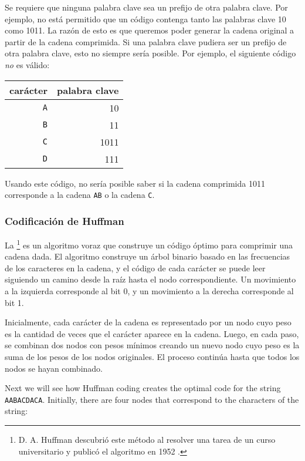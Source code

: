 Se requiere que ninguna palabra clave
sea un prefijo de otra palabra clave.
Por ejemplo, no está permitido que un código
contenga tanto las palabras clave 10
como 1011.
La razón de esto es que queremos
poder generar la cadena original
a partir de la cadena comprimida.
Si una palabra clave pudiera ser un prefijo de otra palabra clave,
esto no siempre sería posible.
Por ejemplo, el siguiente código \emph{no} es válido:
\begin{center}
\begin{tabular}{rr}
carácter & palabra clave \\
\hline
\texttt{A} & 10 \\
\texttt{B} & 11 \\
\texttt{C} & 1011 \\
\texttt{D} & 111 \\
\end{tabular}
\end{center}
Usando este código, no sería posible saber
si la cadena comprimida 1011 corresponde a
la cadena \texttt{AB} o la cadena \texttt{C}.


\subsubsection{Codificación de Huffman}

La \footnote{D. A. Huffman descubrió este método
al resolver una tarea de un curso universitario
y publicó el algoritmo en 1952 \cite{huf52}.} es un algoritmo voraz
que construye un código óptimo para
comprimir una cadena dada.
El algoritmo construye un árbol binario
basado en las frecuencias de los caracteres
en la cadena,
y el código de cada carácter se puede leer
siguiendo un camino desde la raíz hasta
el nodo correspondiente.
Un movimiento a la izquierda corresponde al bit 0,
y un movimiento a la derecha corresponde al bit 1.

Inicialmente, cada carácter de la cadena es
representado por un nodo cuyo peso es la
cantidad de veces que el carácter aparece en la cadena.
Luego, en cada paso, se combinan dos nodos con pesos mínimos
creando un nuevo nodo cuyo peso es la suma de los pesos
de los nodos originales.
El proceso continúa hasta que todos los nodos se hayan combinado.

Next we will see how Huffman coding creates
the optimal code for the string
\texttt{AABACDACA}.
Initially, there are four nodes that correspond
to the characters of the string:

